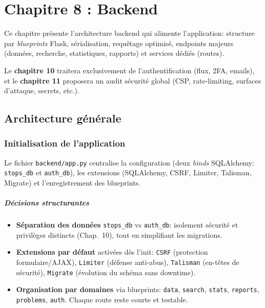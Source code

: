 \chapter{Chapitre 8 : Backend}

Ce chapitre présente l'architecture backend qui alimente l'application: structure par \textit{blueprints} Flask, sérialisation, requêtage optimisé, endpoints majeurs (données, recherche, statistiques, rapports) et services dédiés (routes).

Le \textbf{chapitre 10} traitera exclusivement de l'authentification (flux, 2FA, emails), et le \textbf{chapitre 11} proposera un audit sécurité global (CSP, rate-limiting, surfaces d'attaque, secrets, etc.).

\section{Architecture générale}
\subsection*{Initialisation de l'application}

Le fichier \texttt{backend/app.py} centralise la configuration (deux \textit{binds} SQLAlchemy: \texttt{stops\_db} et \texttt{auth\_db}), les extensions (SQLAlchemy, CSRF, Limiter, Talisman, Migrate) et l'enregistrement des blueprints.

\paragraph{Décisions structurantes}
\begin{itemize}
  \item \textbf{Séparation des données} \texttt{stops\_db} vs \texttt{auth\_db}: isolement sécurité et privilèges distincts (Chap.~10), tout en simplifiant les migrations.
  \item \textbf{Extensions par défaut} activées dès l'init: \texttt{CSRF} (protection formulaire/AJAX), \texttt{Limiter} (défense anti-abus), \texttt{Talisman} (en-têtes de sécurité), \texttt{Migrate} (évolution du schéma sans downtime).
  \item \textbf{Organisation par domaines} via blueprints: \texttt{data}, \texttt{search}, \texttt{stats}, \texttt{reports}, \texttt{problems}, \texttt{auth}. Chaque route reste courte et testable.
\end{itemize}

